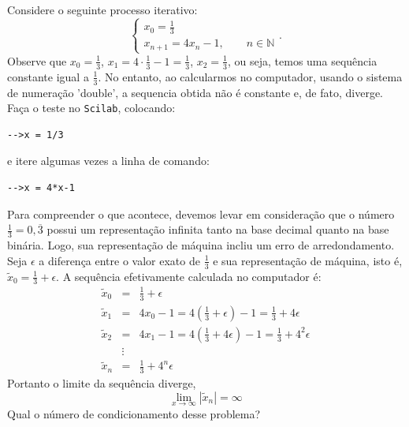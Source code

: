 \begin{ex} Considere o seguinte processo iterativo:
$$
\left\{\begin{array}{l}
x_0=\frac{1}{3}\\
x_{n+1}=4x_n-1,\qquad n\in\mathbb{N}
\end{array}\right..
$$
Observe que $x_0=\frac{1}{3}$, $x_1=4\cdot \frac{1}{3}-1=\frac{1}{3}$, $x_2=\frac{1}{3}$, ou seja, temos uma sequência constante igual a $\frac{1}{3}$. No entanto, ao calcularmos no computador, usando o sistema de numeração 'double', a sequencia obtida não é constante e, de fato, diverge.
\ifisscilab
Faça o teste no \verb+Scilab+, colocando:
\begin{verbatim}
-->x = 1/3
\end{verbatim}
e itere algumas vezes a linha de comando:
\begin{verbatim}
-->x = 4*x-1
\end{verbatim}
\fi

Para compreender o que acontece, devemos levar em consideração que o número $\frac{1}{3}=0,\overline{3}$ possui um representação infinita tanto na base decimal quanto na base binária. Logo, sua representação de máquina incliu um erro de arredondamento. Seja $\epsilon$ a diferença entre o valor exato de $\frac{1}{3}$ e sua representação de máquina, isto é, $\tilde{x}_0=\frac{1}{3}+\epsilon$. A sequência efetivamente calculada no computador é:
\begin{eqnarray*}
\tilde{x}_0&=&\frac{1}{3}+\epsilon\\
\tilde{x}_1&=&4x_0-1=4\left(\frac{1}{3}+\epsilon\right)-1=\frac{1}{3}+4\epsilon\\
\tilde{x}_2&=&4x_1-1=4\left(\frac{1}{3}+4\epsilon\right)-1=\frac{1}{3}+4^2\epsilon\\
&\vdots&\\
\tilde{x}_n&=&\frac{1}{3}+4^n\epsilon
\end{eqnarray*}
Portanto o limite da sequência diverge,
\begin{equation*}
\lim_{x\to\infty}|\tilde{x}_n|=\infty  
\end{equation*}
Qual o número de condicionamento desse problema?
\end{ex}


